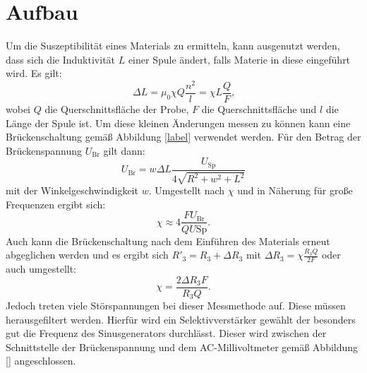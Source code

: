 \section{Aufbau}
\label{sec:Aufbau}

Um die Suszeptibilität eines Materials zu ermitteln, kann ausgenutzt werden, dass sich die Induktivität $L$ einer Spule ändert, falls Materie in diese eingeführt wird. Es gilt:
\begin{equation}
	\Delta L = \mu_0 \chi Q \frac{n^2}{l}=\chi L \frac{Q}{F}\text{,}
\end{equation}
wobei $Q$ die Querschnittsfläche der Probe, $F$ die Querschnittsfläche und $l$ die Länge der Spule ist. Um diese kleinen Änderungen messen zu können kann eine Brückenschaltung gemäß Abbildung \ref{label} verwendet werden. Für den Betrag der Brückenspannung $U_\text{Br}$ gilt dann:
\begin{equation}
	U_\text{Br} = w \Delta L \frac{U_\text{Sp}}{4 \sqrt{R^2+w^2+L^2}}
\end{equation}
mit der Winkelgeschwindigkeit $w$. Umgestellt nach $\chi$ und in Näherung für große Frequenzen ergibt sich:
\begin{equation}
	\chi\approx 4\frac{F U_\text{Br}}{Q U\text{Sp}}\text{.}
\end{equation}
Auch kann die Brückenschaltung nach dem Einführen des Materials erneut abgeglichen werden und es ergibt sich $R'_3 = R_3 + \Delta R_3 $ mit $\Delta R_3 = \chi \frac{R_3 Q}{2 F}$ oder auch umgestellt:
\begin{equation}
	\chi = \frac{2 \Delta R_3 F}{R_3 Q}\text{.}
\end{equation}
Jedoch treten viele Störspannungen bei dieser Messmethode auf. Diese müssen herausgefiltert werden. Hierfür wird ein Selektivverstärker gewählt der besonders gut die Frequenz des Sinusgenerators durchlässt. Dieser wird zwischen der Schnittstelle der Brückenspannung und dem AC-Millivoltmeter gemäß Abbildung \ref{} angeschlossen.